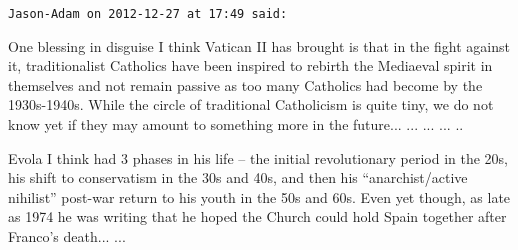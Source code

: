 \begin{footnotesize}
\begin{sffamily}
\hfill

\texttt{Jason-Adam on 2012-12-27 at 17:49 said:}

One blessing in disguise I think Vatican II has brought is that in the fight against it, traditionalist Catholics have been inspired to rebirth the Mediaeval spirit in themselves and not remain passive as too many Catholics had become by the 1930s-1940s. While the circle of traditional Catholicism is quite tiny, we do not know yet if they may amount to something more in the future... ... ... ... ..

Evola I think had 3 phases in his life -- the initial revolutionary period in the 20s, his shift to conservatism in the 30s and 40s, and then his ``anarchist/active nihilist'' post-war return to his youth in the 50s and 60s. Even yet though, as late as 1974 he was writing that he hoped the Church could hold Spain together after Franco's death... ... \end{sffamily}
\end{footnotesize}

